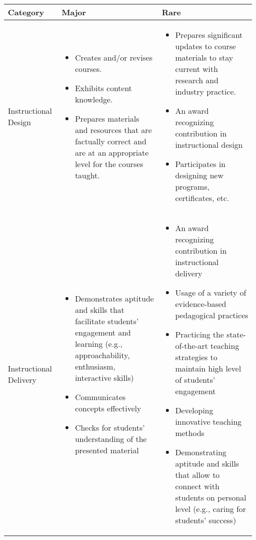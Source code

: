 \documentclass{article}
\begin{document}
\begin{longtable}{p{2cm}p{6cm}P{6cm}}

\hline
\textbf{Category} & \textbf{Major} & \textbf{Rare}\\
\hline
\endhead %
 Instructional Design 
 & \vspace{-\baselineskip}%
  \begin{itemize}[noitemsep,leftmargin=*,topsep=0pt,partopsep=0pt]
        \item Creates and/or revises courses.
        \item Exhibits content knowledge.       
        \item Prepares materials and resources that are factually correct and are at an appropriate level for the courses taught.
    \end{itemize}
  & %
    \begin{itemize}[noitemsep,leftmargin=*,topsep=0pt,partopsep=0pt]
        \item Prepares significant updates to course materials to stay current with research and industry practice.
        \item An award recognizing contribution in instructional design
        \item Participates in designing new programs, certificates, etc. 
    \end{itemize}\\ 
\hline
Instructional Delivery
 & \vspace{-\baselineskip}%
  \begin{itemize}[noitemsep,leftmargin=*,topsep=0pt,partopsep=0pt]
        \item Demonstrates aptitude and skills that facilitate students’ engagement and learning (e.g., approachability, enthusiasm, interactive skills)
        \item Communicates concepts effectively       
        \item Checks for students’ understanding of the presented material
    \end{itemize}
  & %
    \begin{itemize}[noitemsep,leftmargin=*,topsep=0pt,partopsep=0pt]
        \item An award recognizing contribution in instructional delivery
        \item Usage of a variety of evidence-based pedagogical practices
        \item Practicing the state-of-the-art teaching strategies to maintain high level of students’ engagement
        \item Developing innovative teaching methods
        \item Demonstrating aptitude and skills that allow to connect with students on personal level (e.g., caring for students’ success)


\end{itemize}
\end{longtable}
\end{document}
